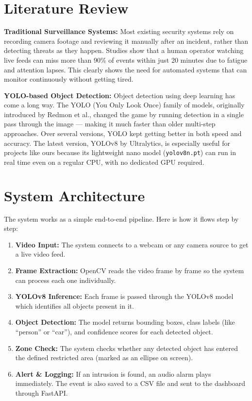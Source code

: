 \documentclass[12pt,a4paper]{article}
\begin{document}
\section{Literature Review}
\textbf{Traditional Surveillance Systems:} Most existing security systems rely on recording camera footage and reviewing it manually after an incident, rather than detecting threats as they happen. Studies show that a human operator watching live feeds can miss more than 90\% of events within just 20 minutes due to fatigue and attention lapses. This clearly shows the need for automated systems that can monitor continuously without getting tired.

\textbf{YOLO-based Object Detection:} Object detection using deep learning has come a long way. The YOLO (You Only Look Once) family of models, originally introduced by Redmon et al., changed the game by running detection in a single pass through the image — making it much faster than older multi-step approaches. Over several versions, YOLO kept getting better in both speed and accuracy. The latest version, YOLOv8 by Ultralytics, is especially useful for projects like ours because its lightweight nano model (\texttt{yolov8n.pt}) can run in real time even on a regular CPU, with no dedicated GPU required.

\section{System Architecture}
The system works as a simple end-to-end pipeline. Here is how it flows step by step:

\begin{enumerate}
    \item \textbf{Video Input:} The system connects to a webcam or any camera source to get a live video feed.
    \item \textbf{Frame Extraction:} OpenCV reads the video frame by frame so the system can process each one individually.
    \item \textbf{YOLOv8 Inference:} Each frame is passed through the YOLOv8 model which identifies all objects present in it.
    \item \textbf{Object Detection:} The model returns bounding boxes, class labels (like ``person'' or ``car''), and confidence scores for each detected object.
    \item \textbf{Zone Check:} The system checks whether any detected object has entered the defined restricted area (marked as an ellipse on screen).
    \item \textbf{Alert \& Logging:} If an intrusion is found, an audio alarm plays immediately. The event is also saved to a CSV file and sent to the dashboard through FastAPI.
\end{enumerate}
\end{document}
